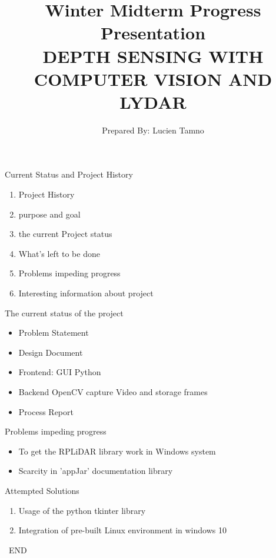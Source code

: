 \documentclass{beamer}
\title[]{\Large Winter Midterm Progress Presentation\\\vspace{1 in}
		\textbf{DEPTH SENSING WITH COMPUTER VISION AND LYDAR}\\\vspace{10pt}}
\author{Prepared By: Lucien Tamno}
\institute{Oregon State University}
\date{\displaydate{date}}
\begin{document}
\begin{frame}
\titlepage
\end{frame}

\begin{frame}[t]{Current Status and Project History} \vspace{10pt}

\begin{enumerate}
\item Project History
\item purpose and goal
\item the current Project status 
\item What’s left to be done
\item Problems impeding progress
\item Interesting information about project
\end{enumerate}

\end{frame}


\begin{frame}[t]{The  current status of the project}
\begin{itemize}
\item Problem Statement 
\item Design Document
\item Frontend: GUI Python 
\item Backend OpenCV capture Video and storage frames 
\item Process Report 
\end{itemize}
\end{frame}



\begin{frame}[t]{Problems impeding progress}
\begin{itemize}
\item  To get the RPLiDAR library work in Windows system
\item  Scarcity in 'appJar' documentation library 
\end{itemize}
\end{frame}


\begin{frame}[t]{Attempted Solutions}
\begin{enumerate}
\item Usage of the  python tkinter library 
\item Integration of pre-built Linux environment in windows 10 
\end{enumerate}

\huge\centering\ END 
\end{frame}
 
\end{document}

